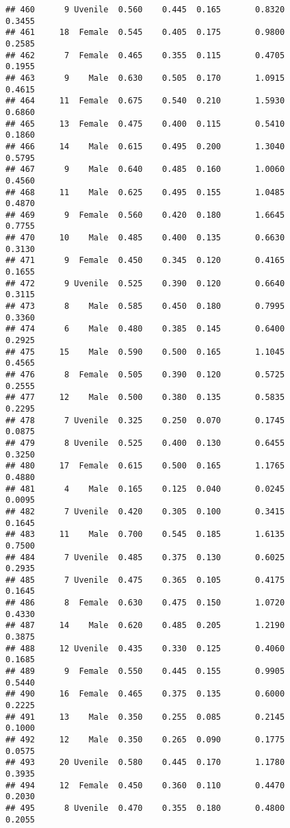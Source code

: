 \documentclass[
]{article}
\begin{document}
\begin{verbatim}
## 460      9 Uvenile  0.560    0.445  0.165       0.8320         0.3455
## 461     18  Female  0.545    0.405  0.175       0.9800         0.2585
## 462      7  Female  0.465    0.355  0.115       0.4705         0.1955
## 463      9    Male  0.630    0.505  0.170       1.0915         0.4615
## 464     11  Female  0.675    0.540  0.210       1.5930         0.6860
## 465     13  Female  0.475    0.400  0.115       0.5410         0.1860
## 466     14    Male  0.615    0.495  0.200       1.3040         0.5795
## 467      9    Male  0.640    0.485  0.160       1.0060         0.4560
## 468     11    Male  0.625    0.495  0.155       1.0485         0.4870
## 469      9  Female  0.560    0.420  0.180       1.6645         0.7755
## 470     10    Male  0.485    0.400  0.135       0.6630         0.3130
## 471      9  Female  0.450    0.345  0.120       0.4165         0.1655
## 472      9 Uvenile  0.525    0.390  0.120       0.6640         0.3115
## 473      8    Male  0.585    0.450  0.180       0.7995         0.3360
## 474      6    Male  0.480    0.385  0.145       0.6400         0.2925
## 475     15    Male  0.590    0.500  0.165       1.1045         0.4565
## 476      8  Female  0.505    0.390  0.120       0.5725         0.2555
## 477     12    Male  0.500    0.380  0.135       0.5835         0.2295
## 478      7 Uvenile  0.325    0.250  0.070       0.1745         0.0875
## 479      8 Uvenile  0.525    0.400  0.130       0.6455         0.3250
## 480     17  Female  0.615    0.500  0.165       1.1765         0.4880
## 481      4    Male  0.165    0.125  0.040       0.0245         0.0095
## 482      7 Uvenile  0.420    0.305  0.100       0.3415         0.1645
## 483     11    Male  0.700    0.545  0.185       1.6135         0.7500
## 484      7 Uvenile  0.485    0.375  0.130       0.6025         0.2935
## 485      7 Uvenile  0.475    0.365  0.105       0.4175         0.1645
## 486      8  Female  0.630    0.475  0.150       1.0720         0.4330
## 487     14    Male  0.620    0.485  0.205       1.2190         0.3875
## 488     12 Uvenile  0.435    0.330  0.125       0.4060         0.1685
## 489      9  Female  0.550    0.445  0.155       0.9905         0.5440
## 490     16  Female  0.465    0.375  0.135       0.6000         0.2225
## 491     13    Male  0.350    0.255  0.085       0.2145         0.1000
## 492     12    Male  0.350    0.265  0.090       0.1775         0.0575
## 493     20 Uvenile  0.580    0.445  0.170       1.1780         0.3935
## 494     12  Female  0.450    0.360  0.110       0.4470         0.2030
## 495      8 Uvenile  0.470    0.355  0.180       0.4800         0.2055

\end{verbatim}
\end{document}
